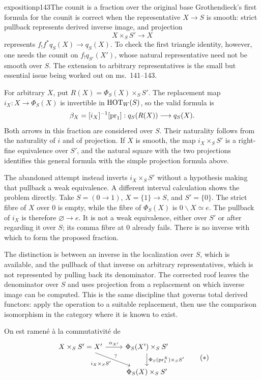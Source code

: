 \begin{dcomment}{exposition}{p143}{The counit is a fraction over the original base}
Grothendieck's first formula for the counit is correct when the representative $X\to S$ is smooth: strict pullback represents derived inverse image, and projection
\[
 X\times_S S'\longrightarrow X
\]
represents $f_!f^*q_S(X)\to q_S(X)$. To check the first triangle identity, however, one needs the counit on $f_!q_{S'}(X')$, whose natural representative need not be smooth over $S$. The extension to arbitrary representatives is the small but essential issue being worked out on ms.~141--143.

For arbitrary $X$, put $R(X)=\Phi_S(X)\times_S S'$. The replacement map $i_X:X\to\Phi_S(X)$ is invertible in $\mathrm{HOT}_W(S)$, so the valid formula is
\[
 \beta_X=[i_X]^{-1}[\mathrm{pr}_1]:q_S(R(X))\longrightarrow q_S(X).
\]
Both arrows in this fraction are considered over $S$. Their naturality follows from the naturality of $i$ and of projection. If $X$ is smooth, the map $i_X\times_S S'$ is a right-fine equivalence over $S'$, and the natural square with the two projections identifies this general formula with the simple projection formula above.

The abandoned attempt instead inverts $i_X\times_S S'$ without a hypothesis making that pullback a weak equivalence. A different interval calculation shows the problem directly. Take $S=(0\to1)$, $X=\{1\}\to S$, and $S'=\{0\}$. The strict fibre of $X$ over $0$ is empty, while the fibre of $\Phi_S(X)$ is $0\backslash X\simeq e$. The pullback of $i_X$ is therefore $\varnothing\to e$. It is not a weak equivalence, either over $S'$ or after regarding it over $S$; its comma fibre at $0$ already fails. There is no inverse with which to form the proposed fraction.

The distinction is between an inverse in the localization over $S$, which is available, and the pullback of that inverse on arbitrary representatives, which is not represented by pulling back its denominator. The corrected roof leaves the denominator over $S$ and uses projection from a replacement on which inverse image can be computed. This is the same discipline that governs total derived functors: apply the operation to a suitable replacement, then use the comparison isomorphism in the category where it is known to exist.
\end{dcomment}


\leavevmode{}On est ramené à la commutativité de
\[
\begin{tikzcd}
X\times_S S' = X' \arrow[r, "{\alpha_{X'}}"] \arrow[dr, "i_X\times_S S'"', "?"] & \Phi_S(X')\times_S S' \arrow[d, "\Phi_S(\pr_1^X)\times_S S'"] \\
 & \Phi_S(X)\times_S S'
\end{tikzcd}
\tag*{$(*)$}
\]


